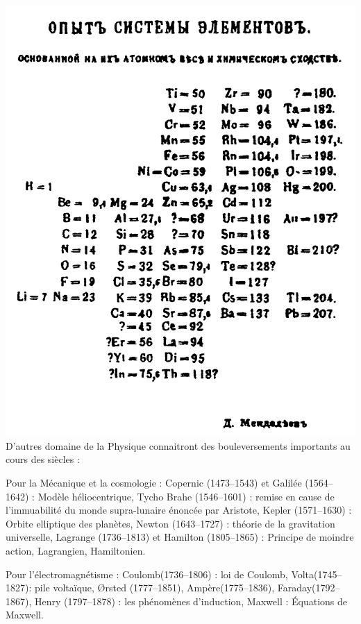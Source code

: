 \marginpar
{
	\vspace{2cm}
	\includegraphics[width=\marginparwidth]{SM/periodique.png}
    \label{periodique}
}
D'autres domaine de la Physique connaitront des bouleversements importants au cours des siècles : 

Pour la Mécanique et la cosmologie : Copernic (\num{1473}--\num{1543}) et Galilée (\num{1564}--\num{1642}) : Modèle héliocentrique, Tycho Brahe (\num{1546}--\num{1601}) : remise en cause de  l'immuabilité du monde supra-lunaire énoncée par Aristote, Kepler (\num{1571}--\num{1630}) : Orbite elliptique des planètes, Newton (\num{1643}--\num{1727}) : théorie de la gravitation universelle, Lagrange (\num{1736}--\num{1813}) et Hamilton (\num{1805}--\num{1865}) : Principe de moindre action, Lagrangien, Hamiltonien.

Pour l'électromagnétisme : Coulomb(\num{1736}--\num{1806}) : loi de Coulomb, Volta(\num{1745}--\num{1827}): pile voltaïque, Ørsted (\num{1777}--\num{1851}), Ampère(\num{1775}--\num{1836}), Faraday(\num{1792}--\num{1867}), Henry (\num{1797}--\num{1878}) : les phénomènes d'induction, Maxwell : Équations de Maxwell.

